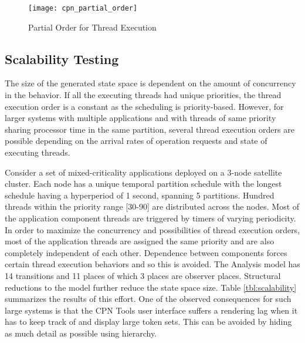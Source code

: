 \vspace{-0.08in}
\begin{figure}[ht] 
\centering
\texttt{[image: cpn\_partial\_order]}
\caption{Partial Order for Thread Execution}
\label{fig:cpn_partial_order}
\vspace{-0.18in}
\end{figure}

\subsection{Scalability Testing}
\label{subsec:Scalability_Testing}

The size of the generated state space is dependent on the amount of concurrency in the behavior. If all the executing threads had unique priorities, the thread execution order is a constant as the scheduling is priority-based. However, for larger systems with multiple applications and with threads of same priority sharing processor time in the same partition, several thread execution orders are possible depending on the arrival rates of operation requests and state of executing threads.  

Consider a set of mixed-criticality applications deployed on a 3-node satellite cluster. Each node has a unique temporal partition schedule with the longest schedule having a hyperperiod of 1 second, spanning 5 partitions. Hundred threads within the priority range [30-90] are distributed across the nodes. Most of the application component threads are triggered by timers of varying periodicity. In order to maximize the concurrency and possibilities of thread execution orders, most of the application threads are assigned the same priority and are also completely independent of each other. Dependence between components forces certain thread execution behaviors and so this is avoided. The Analysis model has 14 transitions and 11 places of which 3 places are observer places. Structural reductions to the model further reduce the state space size. Table \ref{tbl:scalability} summarizes the results of this effort. One of the observed consequences for such large systems is that the CPN Tools user interface suffers a rendering lag when it has to keep track of and display large token sets. This can be avoided by hiding as much detail as possible using hierarchy. 


